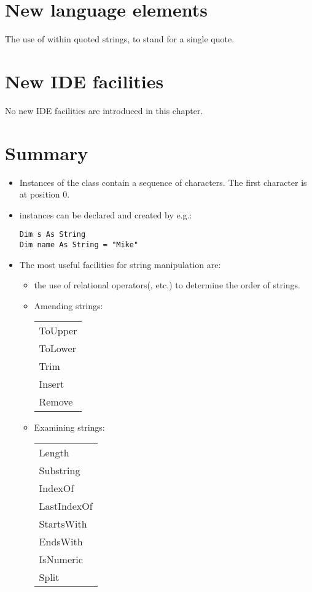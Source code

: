 		
	\section{New language elements}
		The use of  within quoted strings, to stand for a single quote.


	\section{New IDE facilities}
		No new IDE facilities are introduced in this chapter.


	\section{Summary}
		\begin{itemize}
      \item Instances of the class  contain a sequence of characters. The first character is at position 0.
      \item {} instances can be declared and created by e.g.:
		\begin{lstlisting}
Dim s As String
Dim name As String = "Mike"
		\end{lstlisting}
      \item The most useful facilities for string manipulation are: 
				
				\begin{itemize}
					\item the use of relational operators(\keyword{>}, etc.) to determine the order of strings.
					\item	Amending strings:	
						
						\begin{tabular}{>{\collectcell\keyword}l<{\endcollectcell} }
							ToUpper\\
							ToLower \\
							Trim\\
							Insert\\
							Remove
						\end{tabular}

					\item	Examining strings: 
						
						\begin{tabular}{>{\collectcell\keyword}l<{\endcollectcell} }
							Length\\
							Substring \\
							IndexOf\\
							LastIndexOf\\
							StartsWith\\
							EndsWith\\
							IsNumeric \\
							Split
						\end{tabular}
		

\end{itemize}
\end{itemize}
